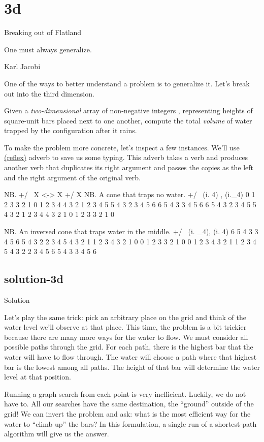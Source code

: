 \documentclass{article}
\begin{document}
\section{3d}{Breaking out of Flatland}

\epigraph{One must always generalize.}{Karl Jacobi}

One of the ways to better understand a problem is to generalize it.
Let's break out into the third dimension.

Given a \emph{two-dimensional} array of non-negative integers , representing heights of square-unit bars placed next to one another, compute the total \emph{volume} of water trapped by the configuration after it rains.

To make the problem more concrete, let's inspect a few instances.
We'll use \href{https://code.jsoftware.com/wiki/Vocabulary/tilde}{\code{~} (reflex)} adverb to save us some typing.
This adverb takes a verb and produces another verb that duplicates its right argument and passes the copies as the left and the right argument of the original verb.

\begin{code}[j]
    NB. +/~ X   <->   X +/ X
    NB. A cone that traps no water.
    +/~  (i. 4) , (i._4)
0 1 2 3 3 2 1 0
1 2 3 4 4 3 2 1
2 3 4 5 5 4 3 2
3 4 5 6 6 5 4 3
3 4 5 6 6 5 4 3
2 3 4 5 5 4 3 2
1 2 3 4 4 3 2 1
0 1 2 3 3 2 1 0

    NB. An inversed cone that traps water in the middle.
    +/~  (i. _4), (i. 4)
6 5 4 3 3 4 5 6
5 4 3 2 2 3 4 5
4 3 2 1 1 2 3 4
3 2 1 0 0 1 2 3
3 2 1 0 0 1 2 3
4 3 2 1 1 2 3 4
5 4 3 2 2 3 4 5
6 5 4 3 3 4 5 6
\end{code}

\subsection{solution-3d}{Solution}

Let's play the same trick: pick an arbitrary place on the grid and think of the water level we'll observe at that place.
This time, the problem is a bit trickier because there are many more ways for the water to flow.
We must consider all possible paths through the grid.
For each path, there is the highest bar that the water will have to flow through.
The water will choose a path where that highest bar is the lowest among all paths.
The height of that bar will determine the water level at that position.

Running a graph search from each point is very inefficient.
Luckily, we do not have to.
All our searches have the same destination, the ``ground'' outside of the grid!
We can invert the problem and ask: what is the most efficient way for the water to ``climb up'' the bars?
In this formulation, a single run of a shortest-path algorithm will give us the answer.
\end{document}

